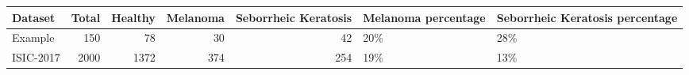\begin{tabular}{lrrrrll}
\toprule
  Dataset &  Total &  Healthy &  Melanoma &  Seborrheic Keratosis & Melanoma percentage & Seborrheic Keratosis percentage \\
\midrule
  Example &    150 &       78 &        30 &                    42 &                 20\% &                             28\% \\
ISIC-2017 &   2000 &     1372 &       374 &                   254 &                 19\% &                             13\% \\
\bottomrule
\end{tabular}
